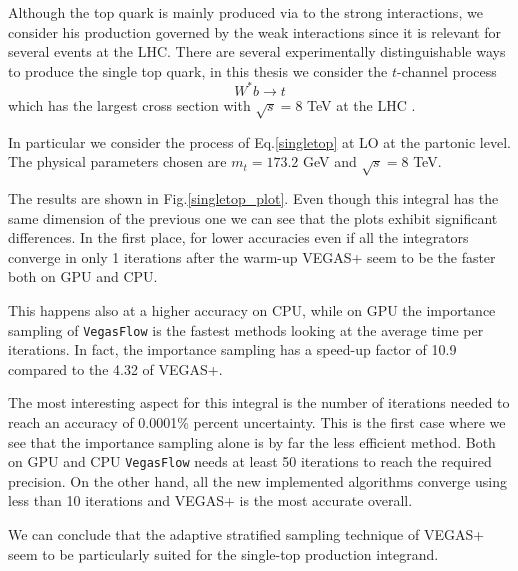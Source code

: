 \documentclass[../main/main.tex]{subfiles}
\begin{document}
Although the top quark is mainly produced via to the strong interactions, we consider his production governed by the weak interactions since it is relevant for several events at the LHC. There are several experimentally distinguishable ways to produce the single top quark, in this thesis we consider the $t$-channel process 
\begin{equation}
	\label{singletop}
	W^* b \to t 
\end{equation}
which has the largest cross section with  $\sqrt{s} = 8$ TeV at the LHC \cite{Brucherseifer_2014}.

In particular we consider the process of Eq.\eqref{singletop} at LO at the partonic level. The physical parameters chosen are $m_t = 173.2$ GeV and $\sqrt{s} = 8$ TeV.

The results are shown in Fig.\ref{singletop_plot}.
Even though this integral has the same dimension of the previous one we can see that the plots exhibit significant differences.
In the first place, for lower accuracies even if all the integrators converge in only 1 iterations after the warm-up VEGAS+ seem to be the faster both on GPU and CPU. 

This happens also at a higher accuracy on CPU, while on GPU the importance sampling of \texttt{VegasFlow} is the fastest methods looking at the average time per iterations. In fact, the importance sampling has a speed-up factor of 10.9 compared to the 4.32 of VEGAS+.

The most interesting aspect for this integral is the number of iterations needed to reach an accuracy of 0.0001\% percent uncertainty.  This is the first case where we see that the importance sampling alone is by far the less efficient method. Both on GPU and CPU \texttt{VegasFlow} needs at least 50 iterations to reach the required precision. On the other hand, all the new implemented algorithms converge using less than 10 iterations and VEGAS+ is the most accurate overall.

We can conclude that the adaptive stratified sampling technique of VEGAS+ seem to be particularly suited for the single-top production integrand.
\end{document}
